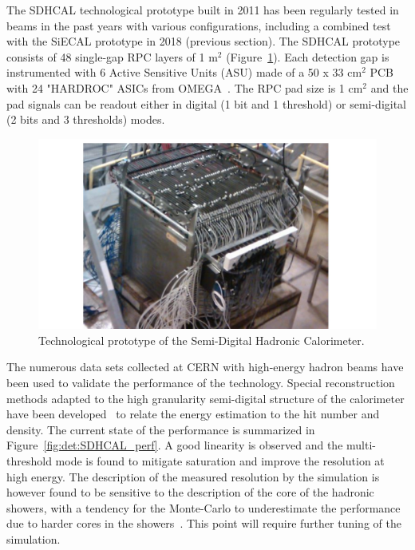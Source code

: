 The SDHCAL technological prototype built in 2011 has been regularly tested in beams in the past years with various configurations, including a combined test with the SiECAL prototype in 2018 (previous section). The SDHCAL prototype consists of 48 single-gap RPC layers of 1 m$^2$ (Figure~\ref{fig:det:SDHCAL_proto}). Each detection gap is instrumented with 6 Active Sensitive Units (ASU) made of a  50 x 33 cm$^2$ PCB with 24 "HARDROC" ASICs from OMEGA~\cite{Callier:2014uqa}. The RPC pad size is 1 cm$^2$ and the pad signals can be readout either in digital (1 bit and 1 threshold) or semi-digital (2 bits and 3 thresholds) modes.

\begin{figure}[t!]
\centering
\includegraphics[width=0.8\hsize]{Detector/fig/SDHCAL_proto.jpg}
\caption{Technological prototype of the Semi-Digital Hadronic Calorimeter.}
\label{fig:det:SDHCAL_proto}
\end{figure}

The numerous data sets collected at CERN with high-energy hadron beams have been used to validate the performance of the technology. Special reconstruction methods adapted to the high granularity semi-digital structure of the calorimeter have been developed~\cite{Buridon:2016ill} to relate the energy estimation to the hit number and density. The current state of the performance is summarized in Figure~\ref{fig:det:SDHCAL_perf}. A good linearity is observed and the multi-threshold mode is found to mitigate saturation and improve the resolution at high energy. The description of the measured resolution by the simulation is however found to be sensitive to the description of the core of the hadronic showers, with a tendency for the Monte-Carlo to underestimate the performance due to harder cores in the showers~\cite{Deng:2016obt}. This point will require further tuning of the simulation.


